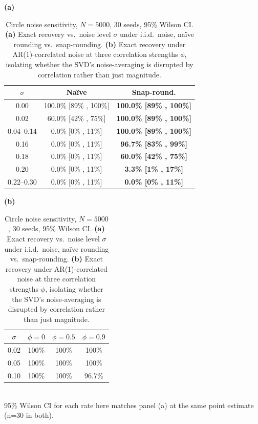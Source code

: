 \documentclass{article}
\begin{document}
\begin{table}[H]
\centering
\caption{Circle noise sensitivity, $N=5000$, 30 seeds, 95\% Wilson CI. \textbf{(a)} Exact recovery vs.\ noise level $\sigma$ under i.i.d.\ noise, na\"{i}ve rounding vs.\ snap-rounding. \textbf{(b)} Exact recovery under AR(1)-correlated noise at three correlation strengths $\phi$, isolating whether the SVD's noise-averaging is disrupted by correlation rather than just magnitude.}
\label{tab:noise}
\begin{minipage}[t]{0.56\textwidth}
\centering
\footnotesize
\textbf{(a)}\\[2pt]
\begin{tabular}{ccc}
\toprule
$\sigma$ & Na\"{i}ve & Snap-round.\\
\midrule
0.00 & 100.0\% [89\% , 100\%] & \textbf{100.0\% [89\% , 100\%]} \\
0.02 & 60.0\% [42\% , 75\%] & \textbf{100.0\% [89\% , 100\%]} \\
0.04--0.14 & 0.0\% [0\% , 11\%] & \textbf{100.0\% [89\% , 100\%]} \\
0.16 & 0.0\% [0\% , 11\%] & \textbf{96.7\% [83\% , 99\%]} \\
0.18 & 0.0\% [0\% , 11\%] & \textbf{60.0\% [42\% , 75\%]} \\
0.20 & 0.0\% [0\% , 11\%] & \textbf{3.3\% [1\% , 17\%]} \\
0.22--0.30 & 0.0\% [0\% , 11\%] & \textbf{0.0\% [0\% , 11\%]} \\
\bottomrule
\end{tabular}
\end{minipage}%
\hfill
\begin{minipage}[t]{0.42\textwidth}
\centering
\scriptsize
\textbf{(b)}\\[2pt]
\begin{tabular}{cccc}
\toprule
$\sigma$ & $\phi{=}0$ & $\phi{=}0.5$ & $\phi{=}0.9$\\
\midrule
0.02 & 100\% & 100\% & 100\% \\
0.05 & 100\% & 100\% & 100\% \\
0.10 & 100\% & 100\% & 96.7\% \\
\bottomrule
\end{tabular}
\\[3pt]
{\tiny 95\% Wilson CI for each rate here matches panel (a) at the same point estimate (n=30 in both).}
\end{minipage}
\end{table}
\end{document}
